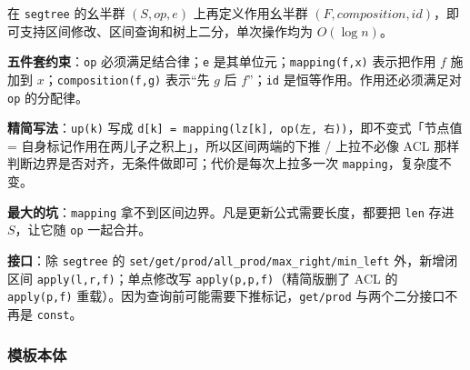		在 \texttt{segtree} 的幺半群 $(S,op,e)$ 上再定义作用幺半群 $(F,composition,id)$，即可支持区间修改、区间查询和树上二分，单次操作均为 $O(\log n)$。

		\textbf{五件套约束}：\texttt{op} 必须满足结合律；\texttt{e} 是其单位元；\texttt{mapping(f,x)} 表示把作用 $f$ 施加到 $x$；\texttt{composition(f,g)} 表示“先 $g$ 后 $f$”；\texttt{id} 是恒等作用。作用还必须满足对 \texttt{op} 的分配律。

		\textbf{精简写法}：\texttt{up(k)} 写成 \texttt{d[k] = mapping(lz[k], op(左, 右))}，即不变式「节点值 = 自身标记作用在两儿子之积上」，所以区间两端的下推 / 上拉不必像 ACL 那样判断边界是否对齐，无条件做即可；代价是每次上拉多一次 \texttt{mapping}，复杂度不变。

		\textbf{最大的坑}：\texttt{mapping} 拿不到区间边界。凡是更新公式需要长度，都要把 \texttt{len} 存进 $S$，让它随 \texttt{op} 一起合并。

		\textbf{接口}：除 \texttt{segtree} 的 \texttt{set/get/prod/all\_prod/max\_right/min\_left} 外，新增闭区间 \texttt{apply(l,r,f)}；单点修改写 \texttt{apply(p,p,f)}（精简版删了 ACL 的 \texttt{apply(p,f)} 重载）。因为查询前可能需要下推标记，\texttt{get/prod} 与两个二分接口不再是 \texttt{const}。

		\subsubsection{模板本体}

